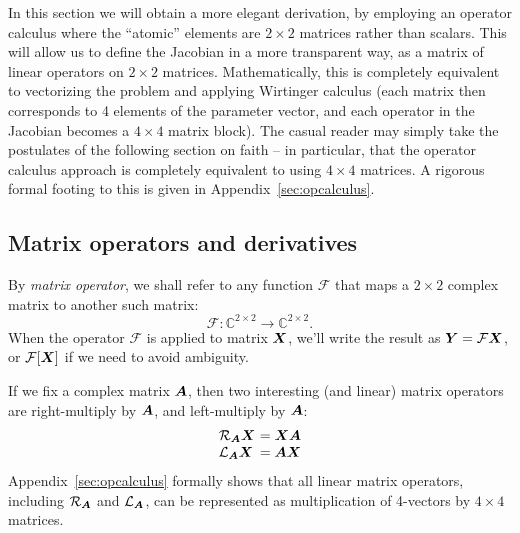 \documentclass[useAMS,usenatbib]{mn2e}
\newcommand{\COMPLEX}{\mathbb{C}}
\newcommand{\mat}[1]{{\bmath{#1}}}
\newcommand{\Rop}[1]{\mathcal{R}_{{#1}}}
\newcommand{\Lop}[1]{\mathcal{L}_{{#1}}}
\numberwithin{equation}{section}
\begin{document}
In this section we will obtain a more elegant  derivation, by employing an operator calculus where the ``atomic'' 
elements are $2\times2$ matrices rather than scalars. This will allow us to define the Jacobian in a more 
transparent way, as a matrix of linear operators on $2\times2$ matrices. Mathematically, this is completely 
equivalent to vectorizing the problem and applying Wirtinger calculus (each matrix then corresponds to 4 elements 
of the parameter vector, and each operator in the Jacobian becomes a $4\times4$ matrix block). The casual
reader may simply take the postulates of the following section on faith -- in particular, that the operator calculus 
approach is completely equivalent to using $4\times4$ matrices. A rigorous formal footing to this is given 
in Appendix~\ref{sec:opcalculus}.


\newcommand{\VEC}[1]{\mathrm{vec}\,{#1}}
\newcommand{\VECINV}[1]{\mathrm{vec}^{-1}\,{#1}}

\subsection{Matrix operators and derivatives}

By \emph{matrix operator}, we shall refer to any function $\mathcal{F}$ that maps a $2\times2$ complex matrix to 
another such matrix:
\begin{equation}
\mathcal{F}:\COMPLEX^{2\times2} \to \COMPLEX^{2\times2}.
\end{equation}
When the operator $\mathcal{F}$ is applied to matrix $\mat{X}$, we'll write the result 
as $\mat{Y}=\mathcal{F}\mat{X}$, or $\mathcal{F}[\mat{X}]$ if we need to avoid ambiguity.

If we fix a complex matrix $\mat{A}$, then two interesting (and linear) matrix operators are
right-multiply by $\mat{A}$, and left-multiply by $\mat{A}$:
\begin{equation}
\begin{array}{l@{~}l}
\Rop{\mat{A}}\mat{X} &= \mat{XA} \\
\Lop{\mat{A}}\mat{X} &= \mat{AX} \\
\end{array}
\end{equation}
Appendix~\ref{sec:opcalculus} formally shows that all linear matrix operators, including $\Rop{\mat{A}}$ and $\Lop{\mat{A}}$,
can be represented as multiplication of 4-vectors by $4\times4$ matrices. 
\end{document}
